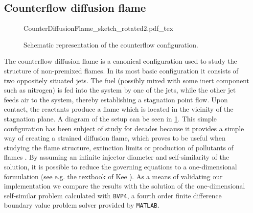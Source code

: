 
\subsection{Counterflow diffusion flame}\label{ss:CDF}

\begin{figure}[b]
	\begin{center}
		\def\svgwidth{0.8\textwidth}
		{CounterDiffusionFlame_sketch_rotated2.pdf_tex}
		\caption{Schematic representation of the counterflow configuration.}
		\label{fig:CDFScheme}
	\end{center}
\end{figure}
The counterflow diffusion flame is a canonical configuration used to study the structure of non-premixed flames. In its most basic configuration it consists of two oppositely situated jets. The fuel (possibly mixed with some inert component such as nitrogen) is fed into the system by one of the jets, while the other jet feeds air to the system, thereby establishing a stagnation point flow. Upon contact, the reactants produce a flame which is located in the vicinity of the stagnation plane. A diagram of the setup can be seen in \cref{fig:CDFScheme}. This simple configuration has been subject of study for decades  because it provides a simple way of creating a strained diffusion flame, which proves to be useful when studying the flame structure, extinction limits or production of pollutants of flames \cite{pandyaStructureFlatCounterFlow1964} \cite{spaldingTheoryMixingChemical1961} \cite{keyesFlameSheetStarting1987}. By assuming an infinite injector diameter and self-similarity of the solution, it is possible to reduce the governing equations to a one-dimensional formulation (see e.g. the textbook of Kee \cite{keeChemicallyReactingFlow2003}). As a means of validating our implementation we compare the results with the solution of the one-dimensional self-similar problem calculated with \lstinline|BVP4|, a fourth order finite difference boundary value problem solver provided by \lstinline|MATLAB|.

